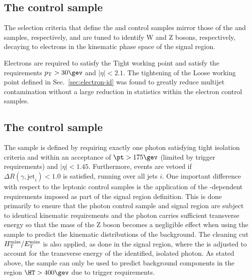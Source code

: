 \subsection{The \texorpdfstring{\ej}{electron plus jets} control sample}
\label{subsec:elecontrolSelection}

The selection criteria that define the \ej and \eej control samples
mirror those of the \mj and \mmj samples, respectively, and are tuned
to identify W and Z bosons, respectively, decaying to electrons in the
kinematic phase space of the signal region. 

Electrons are required to satisfy the Tight working point and satisfy
the requirements $\Pt> 30\gev$ and $|\eta| < 2.1$. The tightening of
the Loose working point defined in Sec.~\ref{sec:electron-id} was
found to greatly reduce multijet contamination without a large
reduction in statistics within the electron control samples.

\subsection{The \texorpdfstring{\gj}{photon plus jets} control sample}
\label{subsec:photoncontrolSelection}


The \gj sample is defined by requiring exactly one photon satisfying
tight isolation criteria and within an acceptance of $\pt > 175\gev$
(limited by trigger requirements) and $|\eta| < 1.45$. Furthermore,
events are vetoed if $\Delta R(\gamma,\textrm{jet}_i) < 1.0$ is
satisfied, running over all jets $i$. One important difference with
respect to the leptonic control samples is the application of the
\HT-dependent \alphat requirements imposed as part of the signal
region definition. This is done primarily to ensure that the photon
control sample and signal region are subject to identical kinematic
requirements and the photon carries sufficient transverse energy so
that the mass of the Z boson becomes a negligible effect when using
the \gj sample to predict the kinematic distributions of the \znunu
background. The cleaning cut $\mbox{$H_{\rm T}^{\rm miss}$}/\mbox{$E_\text{T}^{\rm miss}$}$ is also applied, as done in
the signal region, where the \met is adjusted to account for the
transverse energy of the identified, isolated photon. As stated above,
the \gj sample can only be used to predict background components in
the region $\HT > 400\gev$ due to trigger requirements.
